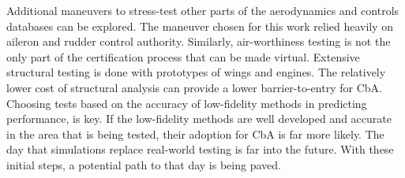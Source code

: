 Additional maneuvers to stress-test other parts of the aerodynamics and controls databases can be explored.
The maneuver chosen for this work relied heavily on aileron and rudder control authority. 
Similarly, air-worthiness testing is not the only part of the certification process that can be made virtual. 
Extensive structural testing is done with prototypes of wings and engines.
The relatively lower cost of structural analysis can provide a lower barrier-to-entry for CbA. 
Choosing tests based on the accuracy of low-fidelity methods in predicting performance, is key. 
If the low-fidelity methods are well developed and accurate in the area that is being tested, their adoption for CbA is far more likely.
The day that simulations replace real-world testing is far into the future. 
With these initial steps, a potential path to that day is being paved. 